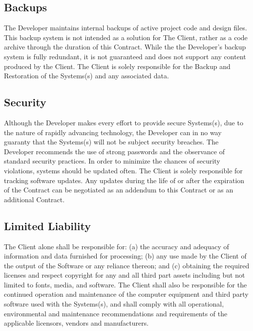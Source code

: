 \documentclass[a4paper,12pt]{article} %
\begin{document}

\subsection{Backups}

The Developer maintains internal backups of active project code and design files. This backup system is not intended as a solution for The Client, rather as a code archive through the duration of this Contract. While the the Developer's backup system is fully redundant, it is not guaranteed and does not support any content produced by the Client. The Client is solely responsible for the Backup and Restoration of the Systems(s) and any associated data.


\subsection{Security}

Although the Developer makes every effort to provide secure Systems(s), due to the nature of rapidly advancing technology, the Developer can in no way guaranty that the Systems(s) will not be subject security breaches. The Developer recommends the use of strong passwords and the observance of standard security practices. In order to minimize the chances of security violations, systems should be updated often. The Client is solely responsible for tracking software updates. Any updates during the life of or after the expiration of the Contract can be negotiated as an addendum to this Contract or as an additional Contract.


\subsection{Limited Liability}

The Client alone shall be responsible for: (a) the accuracy and adequacy of information and data furnished for processing; (b) any use made by the Client of the output of the Software or any reliance thereon; and (c) obtaining the required licenses and respect copyright for any and all third part assets including but not limited to fonts, media, and software. The Client shall also be responsible for the continued operation and maintenance of the computer equipment and third party software used with the Systems(s), and shall comply with all operational, environmental and maintenance recommendations and requirements of the applicable licensors, vendors and manufacturers.
\end{document}
